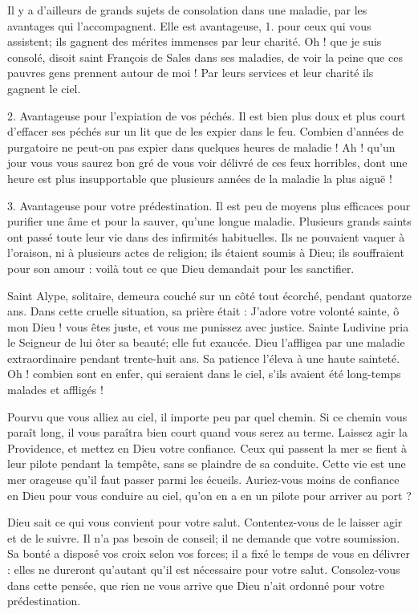 \documentclass[instructions.tex]{subfiles}
\begin{document}
\secundo Il y a d’ailleurs de grands sujets de consolation dans une maladie, par les avantages qui l’accompagnent. Elle est avantageuse, 1. pour ceux qui vous assistent; ils gagnent des mérites immenses par leur charité. Oh ! que je suis consolé, disoit saint François de Sales dans ses maladies, de voir la peine que ces pauvres gens prennent autour de moi ! Par leurs services et leur charité ils gagnent le ciel.
 
2. Avantageuse pour l’expiation de vos péchés. Il est bien plus doux et plus court d’effacer ses péchés sur un lit que de les expier dans le feu. Combien d’années de purgatoire ne peut-on pas expier dans quelques heures de maladie ! Ah ! qu’un jour vous vous saurez bon gré de vous voir délivré de ces feux horribles, dont une heure est plus insupportable que plusieurs années de la maladie la plus aiguë !
 
3. Avantageuse pour votre prédestination. Il est peu de moyens plus efficaces pour purifier une âme et pour la sauver, qu’une longue maladie. Plusieurs grands saints ont passé toute leur vie dans des infirmités habituelles. Ils ne pouvaient vaquer à l’oraison, ni à plusieurs actes de religion; ils étaient soumis à Dieu; ils souffraient pour son amour : voilà tout ce que Dieu demandait pour les sanctifier.
 
Saint Alype, solitaire, demeura couché sur un côté tout écorché, pendant quatorze ans. Dans cette cruelle situation, sa prière était : J’adore votre volonté sainte, ô mon Dieu ! vous êtes juste, et vous me punissez avec justice. Sainte Ludivine pria le Seigneur de lui ôter sa beauté; elle fut exaucée. Dieu l’affligea par une maladie extraordinaire pendant trente-huit ans. Sa patience l’éleva à une haute sainteté. Oh ! combien sont en enfer, qui seraient dans le ciel, s’ils avaient été long-temps malades et affligés !
 
Pourvu que vous alliez au ciel, il importe peu par quel chemin. Si ce chemin vous paraît long, il vous paraîtra bien court quand vous serez au terme. Laissez agir la Providence, et mettez en Dieu votre confiance. Ceux qui passent la mer se fient à leur pilote pendant la tempête, sans se plaindre de sa conduite. Cette vie est une mer orageuse qu’il faut passer parmi les écueils. Auriez-vous moins de confiance en Dieu pour vous conduire au ciel, qu’on en a en un pilote pour arriver au port ?
 
Dieu sait ce qui vous convient pour votre salut. Contentez-vous de le laisser agir et de le suivre. Il n’a pas besoin de conseil; il ne demande que votre soumission. Sa bonté a disposé vos croix selon vos forces; il a fixé le temps de vous en délivrer : elles ne dureront qu’autant qu’il est nécessaire pour votre salut. Consolez-vous dans cette pensée, que rien ne vous arrive que Dieu n’ait ordonné pour votre prédestination.
 
\end{document}
